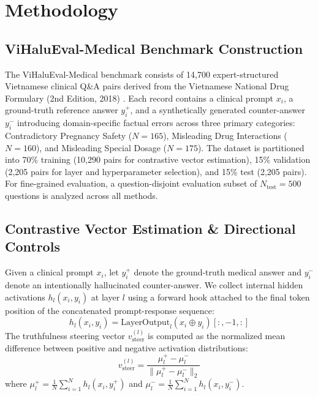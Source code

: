 \documentclass[conference]{IEEEtran}
\begin{document}
\section{Methodology}

\subsection{ViHaluEval-Medical Benchmark Construction}
The ViHaluEval-Medical benchmark consists of 14,700 expert-structured Vietnamese clinical Q\&A pairs derived from the Vietnamese National Drug Formulary (2nd Edition, 2018) \cite{ref6}. Each record contains a clinical prompt $x_i$, a ground-truth reference answer $y_i^+$, and a synthetically generated counter-answer $y_i^-$ introducing domain-specific factual errors across three primary categories: Contradictory Pregnancy Safety ($N=165$), Misleading Drug Interactions ($N=160$), and Misleading Special Dosage ($N=175$). The dataset is partitioned into 70\% training (10,290 pairs for contrastive vector estimation), 15\% validation (2,205 pairs for layer and hyperparameter selection), and 15\% test (2,205 pairs). For fine-grained evaluation, a question-disjoint evaluation subset of $N_{\text{test}}=500$ questions is analyzed across all methods.

\subsection{Contrastive Vector Estimation \& Directional Controls}
Given a clinical prompt $x_i$, let $y_i^+$ denote the ground-truth medical answer and $y_i^-$ denote an intentionally hallucinated counter-answer. We collect internal hidden activations $h_l(x_i, y_i)$ at layer $l$ using a forward hook attached to the final token position of the concatenated prompt-response sequence:
\begin{equation}
h_l(x_i, y_i) = \text{LayerOutput}_l(x_i \oplus y_i)[:, -1, :]
\end{equation}
The truthfulness steering vector $v_{\text{steer}}^{(l)}$ is computed as the normalized mean difference between positive and negative activation distributions:
\begin{equation}
v_{\text{steer}}^{(l)} = \frac{\mu_l^+ - \mu_l^-}{\|\mu_l^+ - \mu_l^-\|_2}
\end{equation}
where $\mu_l^+ = \frac{1}{N} \sum_{i=1}^N h_l(x_i, y_i^+)$ and $\mu_l^- = \frac{1}{N} \sum_{i=1}^N h_l(x_i, y_i^-)$.
\end{document}
